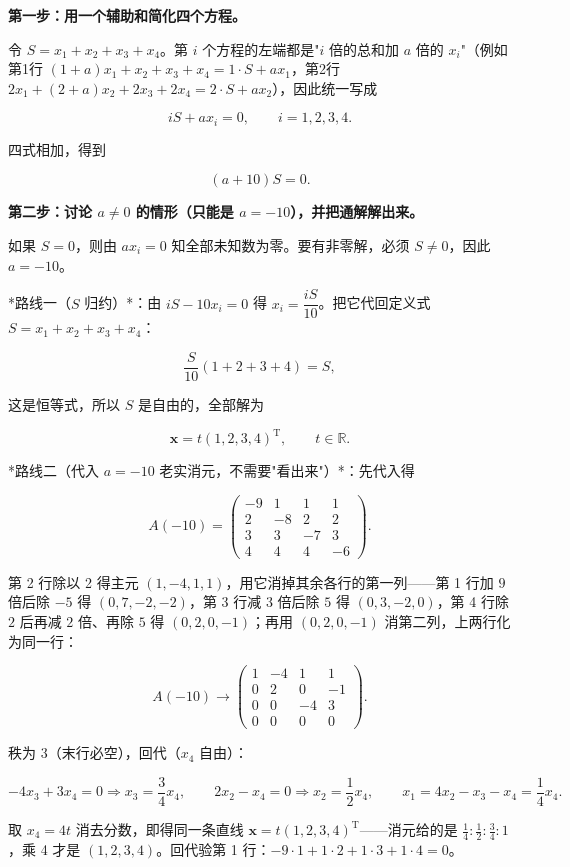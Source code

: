 \documentclass[UTF8,11pt,fontset=windows]{ctexart}
\begin{document}
\textbf{第一步：用一个辅助和简化四个方程。}

令 $S=x_1+x_2+x_3+x_4$。第 $i$ 个方程的左端都是"$i$ 倍的总和加 $a$ 倍的 $x_i$"（例如第1行 $(1+a)x_1+x_2+x_3+x_4=1\cdot S+ax_1$，第2行 $2x_1+(2+a)x_2+2x_3+2x_4=2\cdot S+ax_2$），因此统一写成

$$
iS+a x_i=0,\qquad i=1,2,3,4.
$$

四式相加，得到

$$
(a+10)S=0.
$$

\textbf{第二步：讨论 $a\ne0$ 的情形（只能是 $a=-10$），并把通解解出来。}

如果 $S=0$，则由 $ax_i=0$ 知全部未知数为零。要有非零解，必须 $S\ne0$，因此 $a=-10$。

*路线一（$S$ 归约）*：由 $iS-10x_i=0$ 得 $x_i=\dfrac{iS}{10}$。把它代回定义式 $S=x_1+x_2+x_3+x_4$：

$$
\frac{S}{10}(1+2+3+4)=S,
$$

这是恒等式，所以 $S$ 是自由的，全部解为

$$
\boldsymbol x=t(1,2,3,4)^{\mathrm T},\qquad t\in\mathbb R .
$$

*路线二（代入 $a=-10$ 老实消元，不需要"看出来"）*：先代入得

$$
A(-10)=\begin{pmatrix}-9&1&1&1\\2&-8&2&2\\3&3&-7&3\\4&4&4&-6\end{pmatrix}.
$$

第 2 行除以 2 得主元 $(1,-4,1,1)$，用它消掉其余各行的第一列——第 1 行加 $9$ 倍后除 $-5$ 得 $(0,7,-2,-2)$，第 3 行减 $3$ 倍后除 $5$ 得 $(0,3,-2,0)$，第 4 行除 $2$ 后再减 $2$ 倍、再除 $5$ 得 $(0,2,0,-1)$；再用 $(0,2,0,-1)$ 消第二列，上两行化为同一行：

$$
A(-10)\longrightarrow
\begin{pmatrix}1&-4&1&1\\0&2&0&-1\\0&0&-4&3\\0&0&0&0\end{pmatrix}.
$$

秩为 $3$（末行必空），回代（$x_4$ 自由）：

$$
-4x_3+3x_4=0\Rightarrow x_3=\frac34x_4,\qquad
2x_2-x_4=0\Rightarrow x_2=\frac12x_4,\qquad
x_1=4x_2-x_3-x_4=\frac14x_4 .
$$

取 $x_4=4t$ 消去分数，即得同一条直线 $\boldsymbol x=t(1,2,3,4)^{\mathrm T}$——消元给的是 $\frac14:\frac12:\frac34:1$，乘 4 才是 $(1,2,3,4)$。回代验第 1 行：$-9\cdot1+1\cdot2+1\cdot3+1\cdot4=0$。
\end{document}
